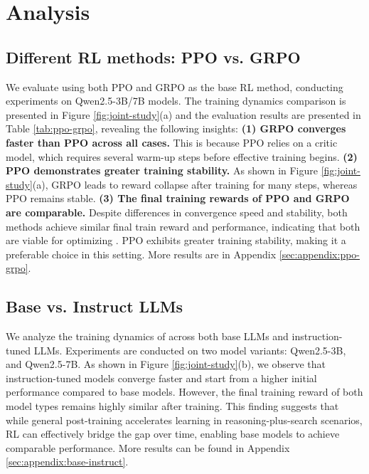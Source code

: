 
\section{Analysis}

\subsection{Different RL methods: PPO vs. GRPO}\label{sec:ppo-grpo}

We evaluate \Ours using both PPO and GRPO as the base RL method, conducting experiments on Qwen2.5-3B/7B models. The training dynamics comparison is presented in Figure \ref{fig:joint-study}(a) and the evaluation results are presented in Table \ref{tab:ppo-grpo}, revealing the following insights:
\textbf{(1) GRPO converges faster than PPO across all cases.} This is because PPO relies on a critic model, which requires several warm-up steps before effective training begins.
\textbf{(2) PPO demonstrates greater training stability.} As shown in Figure \ref{fig:joint-study}(a), GRPO leads to reward collapse after training for many steps, whereas PPO remains stable.
\textbf{(3) The final training rewards of PPO and GRPO are comparable.} Despite differences in convergence speed and stability, both methods achieve similar final train reward and performance, indicating that both are viable for optimizing \Ours.
PPO exhibits greater training stability, making it a preferable choice in this setting. 
More results are in Appendix \ref{sec:appendix:ppo-grpo}.



\subsection{Base vs. Instruct LLMs}

We analyze the training dynamics of \Ours across both base LLMs and instruction-tuned LLMs. Experiments are conducted on two model variants: Qwen2.5-3B, and Qwen2.5-7B.
As shown in Figure \ref{fig:joint-study}(b), we observe that instruction-tuned models converge faster and start from a higher initial performance compared to base models. 
However, the final training reward of both model types remains highly similar after training. 
This finding suggests that while general post-training accelerates learning in reasoning-plus-search scenarios, RL can effectively bridge the gap over time, enabling base models to achieve comparable performance. More results can be found in Appendix \ref{sec:appendix:base-instruct}.

